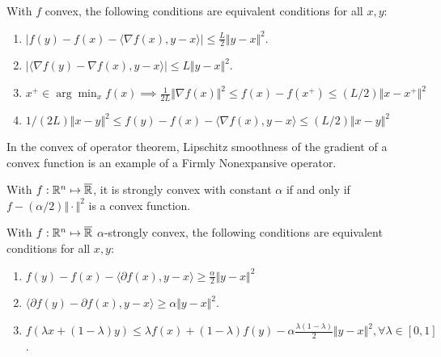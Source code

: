 \documentclass[12pt]{article}
\begin{document}
        \begin{theorem}
            With $f$ convex, the following conditions are equivalent conditions for all $x, y$: 
            \begin{enumerate}
                \item $|f(y) - f(x) - \langle \nabla f(x), y - x\rangle| \le \frac{L}{2}\Vert y - x\Vert^2$. 
                \item $|\langle \nabla f(y) - \nabla f(x), y - x\rangle| \le L\Vert y - x\Vert^2$. 
                \item $x^+\in \arg\min_x{f(x)} \implies \frac{1}{2L}\Vert \nabla f(x)\Vert^2 \le f(x) - f(x^+) \le (L/2) \Vert x - x^+\Vert^2$
                \item $ 1/(2L)\Vert x - y\Vert^2 \le  f(y) - f(x) - \langle \nabla f(x), y -x\rangle \le (L/2)\Vert x - y\Vert^2$
            \end{enumerate}    
        \end{theorem}
        \begin{remark}
            In the convex of operator theorem, Lipschitz smoothness of the gradient of a convex function is an example of a Firmly Nonexpansive operator. 
        \end{remark}

        \begin{definition}
            With $f: \mathbb R^n \mapsto \overline {\mathbb R}$, it is strongly convex with constant $\alpha$ if and only if $f - (\alpha/2)\Vert \cdot\Vert^2$ is a convex function. 
        \end{definition}
        
        \begin{theorem}
            With $f:\mathbb R^n \mapsto \overline {\mathbb R}$ $\alpha$-strongly convex, the following conditions are equivalent conditions for all $x, y$: 
            \begin{enumerate}
                \item $f(y) - f(x) - \langle \partial f(x),y - x \rangle\ge \frac{\alpha}{2}\Vert y - x\Vert^2$
                \item $\langle \partial f(y) - \partial f(x), y - x\rangle \ge \alpha\Vert y - x\Vert^2$. 
                \item $f(\lambda x + (1 - \lambda)y) \le \lambda f(x) + (1 - \lambda)f(y) -\alpha\frac{\lambda(1 - \lambda)}{2}\Vert y - x\Vert^2, \forall \lambda \in [0, 1]$. 
            \end{enumerate}
        \end{theorem}
\end{document}
